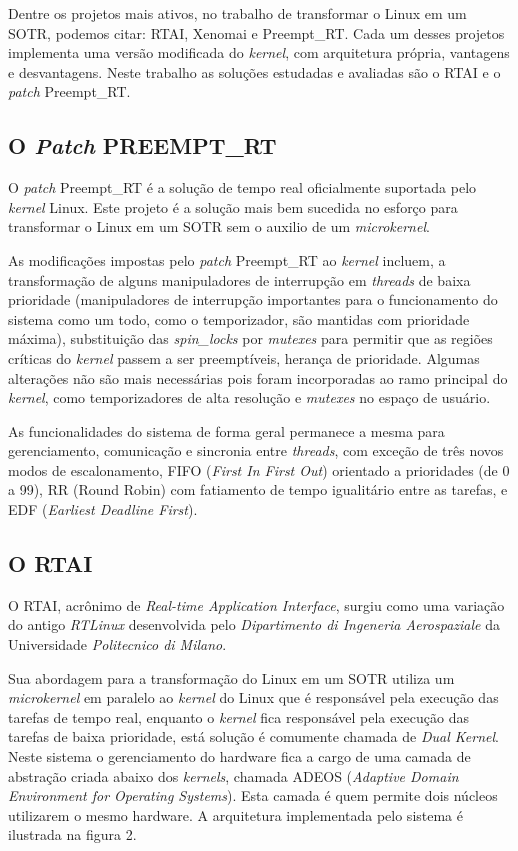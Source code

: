 Dentre os projetos mais ativos, no trabalho de transformar o Linux em um SOTR, podemos citar: RTAI, Xenomai e Preempt\_RT. Cada um desses projetos implementa uma versão modificada do \textit{kernel}, com arquitetura própria, vantagens e desvantagens. Neste trabalho as soluções estudadas e avaliadas são o RTAI e o \textit{patch} Preempt\_RT.

\subsection{O \textit{Patch} PREEMPT\_RT}
O \textit{patch} Preempt\_RT é a solução de tempo real oficialmente suportada pelo \textit{kernel} Linux. Este projeto é a solução mais bem sucedida no esforço para transformar o Linux em um SOTR sem o auxilio de um \textit{microkernel}.

As modificações impostas pelo \textit{patch} Preempt\_RT ao \textit{kernel} incluem, a transformação de alguns manipuladores de interrupção em \textit{threads} de baixa prioridade (manipuladores de interrupção importantes para o funcionamento do sistema como um todo, como o temporizador, são mantidas com prioridade máxima), substituição das \textit{spin\_locks} por \textit{mutexes} para permitir que as regiões críticas do \textit{kernel} passem a ser preemptíveis, herança de prioridade. Algumas alterações não são mais necessárias pois foram incorporadas ao ramo principal do \textit{kernel}, como temporizadores de alta resolução e \textit{mutexes} no espaço de usuário.

As funcionalidades do sistema de forma geral permanece a mesma para gerenciamento, comunicação e sincronia entre \textit{threads}, com exceção de três novos modos de escalonamento, FIFO (\textit{First In First Out}) orientado a prioridades (de 0 a 99), RR (Round Robin) com fatiamento de tempo igualitário entre as tarefas, e EDF (\textit{Earliest Deadline First}).

\subsection{O RTAI}
O RTAI, acrônimo de \textit{Real-time Application Interface}, surgiu como uma variação do antigo \textit{RTLinux} desenvolvida pelo \textit{Dipartimento di Ingeneria Aerospaziale} da Universidade \textit{Politecnico di Milano}.

Sua abordagem para a transformação do Linux em um SOTR utiliza um \textit{microkernel} em paralelo ao \textit{kernel} do Linux que é responsável pela execução das tarefas de tempo real, enquanto o \textit{kernel} fica responsável pela execução das tarefas de baixa prioridade, está solução é comumente chamada de \textit{Dual Kernel}. Neste sistema o gerenciamento do hardware fica a cargo de uma camada de abstração criada abaixo dos \textit{kernels}, chamada ADEOS (\textit{Adaptive Domain Environment for Operating Systems}). Esta camada é quem permite dois  núcleos utilizarem o mesmo hardware. A arquitetura implementada pelo sistema é ilustrada na figura 2.

